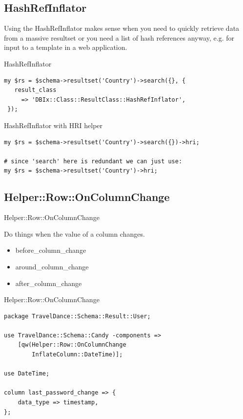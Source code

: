 \subsection{HashRefInflator}

Using the HashRefInflator makes sense when you need to quickly retrieve
data from a massive resultset or you need a list of hash references anyway,
e.g. for input to a template in a web application.

\begin{frame}[fragile]{HashRefInflator}
\begin{lstlisting}
my $rs = $schema->resultset('Country')->search({}, {
   result_class
     => 'DBIx::Class::ResultClass::HashRefInflator',
 });
\end{lstlisting}
\end{frame}

\begin{frame}[fragile]{HashRefInflator with HRI helper}
\begin{lstlisting}
my $rs = $schema->resultset('Country')->search({})->hri;

# since 'search' here is redundant we can just use:
my $rs = $schema->resultset('Country')->hri;
\end{lstlisting}
\end{frame}

\subsection{Helper::Row::OnColumnChange}

\begin{frame}[fragile]{Helper::Row::OnColumnChange}

Do things when the value of a column changes.

\begin{itemize}
\item before\_column\_change
\item around\_column\_change
\item after\_column\_change
\end{itemize}

\end{frame}

\begin{frame}[fragile]{Helper::Row::OnColumnChange}

\begin{lstlisting}
package TravelDance::Schema::Result::User;

use TravelDance::Schema::Candy -components =>
    [qw(Helper::Row::OnColumnChange 
        InflateColumn::DateTime)];

use DateTime;

column last_password_change => {
    data_type => timestamp,
};
\end{lstlisting}
\end{frame}

